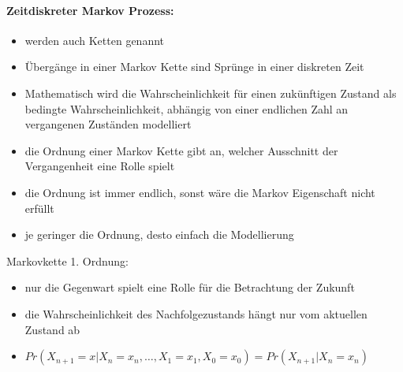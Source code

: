 \paragraph{Zeitdiskreter Markov Prozess:}
\begin{itemize}
\item werden auch Ketten genannt
\item \"Uberg\"ange in einer Markov Kette sind Spr\"unge in einer diskreten Zeit
\item Mathematisch wird die Wahrscheinlichkeit f\"ur einen zuk\"unftigen Zustand als bedingte Wahrscheinlichkeit, abh\"angig von einer endlichen Zahl an vergangenen Zust\"anden modelliert
\item die Ordnung einer Markov Kette gibt an, welcher Ausschnitt der Vergangenheit eine Rolle spielt
\item die Ordnung ist immer endlich, sonst w\"are die Markov Eigenschaft nicht erf\"ullt
\item je geringer die Ordnung, desto einfach die Modellierung
\end{itemize}

Markovkette 1. Ordnung:
\begin{itemize}
\item nur die Gegenwart spielt eine Rolle f\"ur die Betrachtung der Zukunft
\item die Wahrscheinlichkeit des Nachfolgezustands h\"angt nur vom aktuellen Zustand ab
\item $Pr(X_{n+1} = x | X_n = x_n, \ldots, X_1 = x_1, X_0 = x_0) = Pr(X_{n+1}|X_n = x_n)$
\end{itemize}

